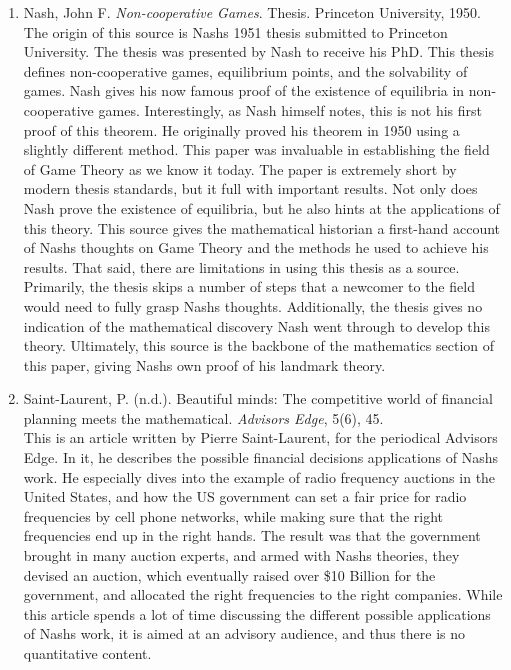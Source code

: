 \documentclass[11pt]{article}
\begin{document}
\begin{enumerate}
\item Nash, John F. \textit{Non-cooperative Games}. Thesis. Princeton University, 1950.\\

The origin of this source is Nash\textsc{}s 1951 thesis submitted to Princeton University. The thesis was presented by Nash to receive his PhD. This thesis defines non-cooperative games, equilibrium points, and the solvability of games. Nash gives his now famous proof of the existence of equilibria in non-cooperative games. Interestingly, as Nash himself notes, this is not his first proof of this theorem. He originally proved his theorem in 1950 using a slightly different method. This paper was invaluable in establishing the field of Game Theory as we know it today. The paper is extremely short by modern thesis standards, but it full with important results. Not only does Nash prove the existence of equilibria, but he also hints at the applications of this theory. This source gives the mathematical historian a first-hand account of Nash\textsc{}s thoughts on Game Theory and the methods he used to achieve his results. That said, there are limitations in using this thesis as a source. Primarily, the thesis skips a number of steps that a newcomer to the field would need to fully grasp Nash\textsc{}s thoughts. Additionally, the thesis gives no indication of the mathematical discovery Nash went through to develop this theory. Ultimately, this source is the backbone of the mathematics section of this paper, giving Nash\textsc{}s own proof of his landmark theory.\\

\item Saint-Laurent, P. (n.d.). Beautiful minds: The competitive world of financial planning meets the mathematical.\textit{ Advisor\textsc{}s Edge}, 5(6), 45.\\

This is an article written by Pierre Saint-Laurent, for the periodical Advisor\textsc{}s Edge. In it, he describes the possible financial decisions applications of Nash\textsc{}s work. He especially dives into the example of radio frequency auctions in the United States, and how the US government can set a fair price for radio frequencies by cell phone networks, while making sure that the right frequencies end up in the right hands. The result was that the government brought in many auction experts, and armed with Nash\textsc{}s theories, they devised an auction, which eventually raised over \$10 Billion for the government, and allocated the right frequencies to the right companies. While this article spends a lot of time discussing the different possible applications of Nash\textsc{}s work, it is aimed at an advisory audience, and thus there is no quantitative content.\\ 



\end{enumerate}
\end{document}
